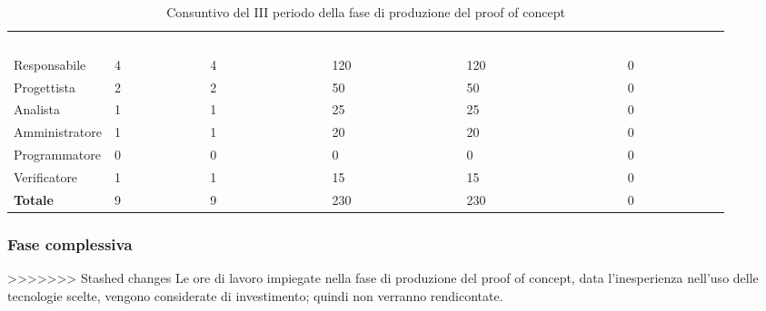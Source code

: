 \begin{table}[!htbp]
\begin{center}
\renewcommand{\arraystretch}{1.5}
\begin{tabular}{ m{}<{\centering}  m{}<{\centering} m{}<{\centering} m{}<{\centering} m{}<{\centering} m{}<{\centering}}
	\rowcolor{darkblue}
	\textcolor{white}{\textbf{Ruolo}} & \textcolor{white}{\textbf{Ore Effettive}} & \textcolor{white}{\textbf{Ore Preventivate}}&\textcolor{white}{\textbf{Costo Effettivo (\euro) }}&\textcolor{white}{\textbf{Costo Preventivato (\euro)}}&\textcolor{white}{\textbf{Differenza (\euro)}}\\ 
	
	Responsabile  & 4 & 4 & 120 & 120 & 0\\	
	
	Progettista & 2 & 2 & 50 & 50 & 0\\
	
	Analista & 1  & 1 & 25 & 25 & 0 \\

	Amministratore & 1 & 1 & 20 & 20 & 0 \\
	
	Programmatore & 0 &0 &0 & 0 & 0 \\
	
	Verificatore & 1 & 1 & 15 & 15 & 0 \\
	
	\textbf{Totale} & 9 & 9 & 230 & 230 & 0 \\
	
\end{tabular}
\caption{Consuntivo del III periodo della fase di produzione del proof of concept}
\end{center}
\end{table}

\subsubsection{Fase complessiva}
>>>>>>> Stashed changes
Le ore di lavoro impiegate nella fase di produzione del proof of concept,  data l'inesperienza nell'uso delle tecnologie scelte,  vengono considerate di investimento; quindi non verranno rendicontate.

